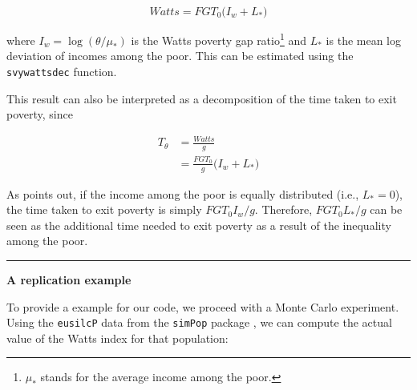 \documentclass[
]{book}
\newenvironment{Shaded}{\begin{snugshade}}{\end{snugshade}}
\newcommand{\AttributeTok}[1]{\textcolor[rgb]{0.13,0.29,0.53}{#1}}
\newcommand{\CommentTok}[1]{\textcolor[rgb]{0.56,0.35,0.01}{\textit{#1}}}
\newcommand{\ConstantTok}[1]{\textcolor[rgb]{0.56,0.35,0.01}{#1}}
\newcommand{\DecValTok}[1]{\textcolor[rgb]{0.00,0.00,0.81}{#1}}
\newcommand{\FunctionTok}[1]{\textcolor[rgb]{0.13,0.29,0.53}{\textbf{#1}}}
\newcommand{\NormalTok}[1]{#1}
\newcommand{\OtherTok}[1]{\textcolor[rgb]{0.56,0.35,0.01}{#1}}
\newcommand{\SpecialCharTok}[1]{\textcolor[rgb]{0.81,0.36,0.00}{\textbf{#1}}}
\newcommand{\StringTok}[1]{\textcolor[rgb]{0.31,0.60,0.02}{#1}}
\begin{document}
\[
Watts = FGT_0 \big( I_w + L_* \big)
\]

where \(I_w = \log(\theta/\mu_*)\) is the Watts poverty gap ratio\footnote{ \(\mu_*\) stands for the average income among the poor.} and \(L_*\) is the mean log deviation of incomes among the poor. This can be estimated using the \texttt{svywattsdec} function.

This result can also be interpreted as a decomposition of the time taken to exit poverty, since

\[
\begin{aligned}
T_\theta &= \frac{Watts}{g} \\ 
&= \frac{FGT_0}{g} \big( I_w + L_* \big)
\end{aligned}
\]

As \textcite{murdoch1998} points out, if the income among the poor is equally distributed (i.e., \(L_*=0\)), the time taken to exit poverty is simply \(FGT_0 I_w / g\). Therefore, \(FGT_0 L_* / g\) can be seen as the additional time needed to exit poverty as a result of the inequality among the poor.

\begin{center}\rule{0.5\linewidth}{0.5pt}\end{center}

\textbf{A replication example}

To provide a example for our code, we proceed with a Monte Carlo experiment.
Using the \texttt{eusilcP} data from the \texttt{simPop} package \autocite{R-simPop}, we can compute the actual value of the Watts index for that population:

\begin{Shaded}
\end{Shaded}
\end{document}
